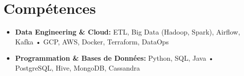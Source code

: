 \documentclass[11pt,a4paper,sans]{moderncv}
\begin{document}
  \vspace{-15pt}
  \section{\fontsize{11}\selectfont Compétences}
  \vspace{-6pt}
  \begin{itemize}[leftmargin=0cm, itemsep=-2pt, topsep=0pt, partopsep=0pt, parsep=0pt, label={}]
    \item \textbf{Data Engineering \& Cloud:} ETL, Big Data (Hadoop, Spark), Airflow, Kafka • GCP, AWS, Docker, Terraform, DataOps
    \item \textbf{Programmation \& Bases de Données:} Python, SQL, Java • PostgreSQL, Hive, MongoDB, Cassandra

  \end{itemize} 

 

  
\end{document}
